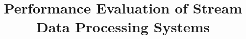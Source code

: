 \documentclass{vldb}
\begin{document}
\newcommand{\argmin}{\operatornamewithlimits{argmin}}
\newcommand{\argmax}{\operatornamewithlimits{argmax}}


\title{ Performance Evaluation of Stream Data Processing Systems}



%
%
%
%

\end{document}
